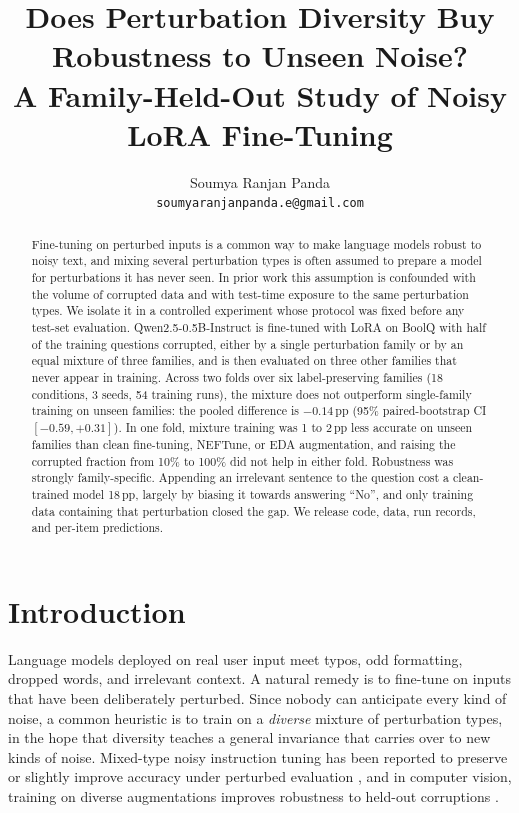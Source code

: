 \documentclass[11pt]{article}
\title{Does Perturbation Diversity Buy Robustness to Unseen Noise?\\A Family-Held-Out Study of Noisy LoRA Fine-Tuning}
\author{Soumya Ranjan Panda\\\texttt{soumyaranjanpanda.e@gmail.com}}
\date{}
\newcommand{\ppts}{\,pp}
\begin{document}
\maketitle

\begin{abstract}
Fine-tuning on perturbed inputs is a common way to make language models robust to noisy text, and mixing several perturbation types is often assumed to prepare a model for perturbations it has never seen. In prior work this assumption is confounded with the volume of corrupted data and with test-time exposure to the same perturbation types. We isolate it in a controlled experiment whose protocol was fixed before any test-set evaluation. Qwen2.5-0.5B-Instruct is fine-tuned with LoRA on BoolQ with half of the training questions corrupted, either by a single perturbation family or by an equal mixture of three families, and is then evaluated on three other families that never appear in training. Across two folds over six label-preserving families (18 conditions, 3 seeds, 54 training runs), the mixture does not outperform single-family training on unseen families: the pooled difference is $-0.14$\ppts{} (95\% paired-bootstrap CI $[-0.59, +0.31]$). In one fold, mixture training was 1 to 2\ppts{} less accurate on unseen families than clean fine-tuning, NEFTune, or EDA augmentation, and raising the corrupted fraction from 10\% to 100\% did not help in either fold. Robustness was strongly family-specific. Appending an irrelevant sentence to the question cost a clean-trained model 18\ppts{}, largely by biasing it towards answering ``No'', and only training data containing that perturbation closed the gap. We release code, data, run records, and per-item predictions.
\end{abstract}

\section{Introduction}

Language models deployed on real user input meet typos, odd formatting, dropped words, and irrelevant context. A natural remedy is to fine-tune on inputs that have been deliberately perturbed. Since nobody can anticipate every kind of noise, a common heuristic is to train on a \emph{diverse} mixture of perturbation types, in the hope that diversity teaches a general invariance that carries over to new kinds of noise. Mixed-type noisy instruction tuning has been reported to preserve or slightly improve accuracy under perturbed evaluation \citep{alajrami2025noisy}, and in computer vision, training on diverse augmentations improves robustness to held-out corruptions \citep{hendrycks2019benchmarking,hendrycks2020augmix}.
\end{document}
